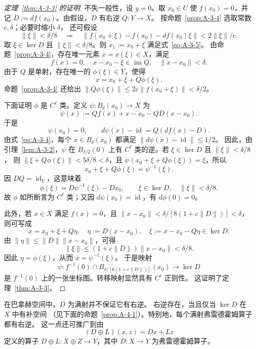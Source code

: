 \begin{proof}[定理~\ref{thm:A-3-3} 的证明]
不失一般性，设 $y=0$。取 $x_0\in U$ 使 $f(x_0)=0$，并记
$D:=df(x_0)$。由假设，$D$ 有右逆 $Q:Y\to X$。
按命题~\ref{prop:A-3-4} 选取常数 $c,\delta$；必要时缩小 $\delta$，
还可假设
\[
  \|\xi\|<\delta/8
  \quad\Longrightarrow\quad
  \|f(x_0+\xi)-f(x_0)-df(x_0)\xi\|<2\|\xi\|/c.
\]
取 $\xi\in\ker D$ 且 $\|\xi\|<\delta/8$。则
$x_1:=x_0+\xi$ 满足式~\eqref{eq:A-3-5}。
由命题~\ref{prop:A-3-4}，存在唯一元素 $x=x(\xi)\in X$，满足
\[
  f(x)=0,\quad x-x_0-\xi\in\operatorname{im}Q,
  \quad \|x-x_0\|<\delta.
\]
由于 $Q$ 是单射，存在唯一的 $\phi(\xi)\in Y$，使得
\[
  x=x_0+\xi+Q\phi(\xi).
\]
命题~\ref{prop:A-3-4} 还给出
$\|Q\phi(\xi)\|\le2c\|f(x_0+\xi)\|<\delta/2$。

下面证明 $\phi$ 是 $C^\ell$ 类。定义 $\psi:B_\delta(x_0)\to X$ 为
\[
  \psi(x):=Qf(x)+x-x_0-QD(x-x_0).
\]
于是
\[
  \psi(x_0)=0,
  \qquad d\psi(x)-\operatorname{id}=Q(df(x)-D).
\]
由式~\eqref{eq:A-3-4}，每个 $x\in B_\delta(x_0)$ 都满足
$\|d\psi(x)-\operatorname{id}\|\le1/2$。
因此，由引理~\ref{lem:A-3-2}，$\psi$ 在 $B_{\delta/2}(0)$
上有 $C^\ell$ 类的逆。若 $\xi\in\ker D$ 且 $\|\xi\|<\delta/8$，
则 $\|\xi+Q\phi(\xi)\|<5\delta/8<\delta$，且
$\psi(x_0+\xi+Q\phi(\xi))=\xi$，所以
\[
  x_0+\xi+Q\phi(\xi)=\psi^{-1}(\xi).
\]
因 $DQ=\operatorname{id}_Y$，这意味着
\[
  \phi(\xi)=D\psi^{-1}(\xi)-Dx_0,
  \qquad \xi\in\ker D,\quad\|\xi\|<\delta/8.
\]
故 $\phi$ 如所断言为 $C^\ell$ 类；又因
$d\psi(x_0)=\operatorname{id}$，有 $d\phi(0)=0$。

此外，若 $x\in X$ 满足 $f(x)=0$，且
$\|x-x_0\|<\delta/[8(1+c\|D\|)]<\delta$，
则可写成
\[
  x=x_0+\xi+Q\eta,\quad
  \eta:=D(x-x_0),\quad
  \xi:=x-x_0-Q\eta\in\ker D.
\]
由 $\|\eta\|\le\|D\|\|x-x_0\|$，可得
\[
  \|\xi\|\le(1+c\|D\|)\|x-x_0\|<\delta/8.
\]
因此 $\eta=\phi(\xi)$，从而 $x=\psi^{-1}(\xi)$。
于是映射
\[
  \psi:f^{-1}(0)\cap
  B_{\delta/[8(1+c\|D\|)]}(x_0)\longrightarrow\ker D
\]
是 $f^{-1}(0)$ 上的一张坐标图。转移映射显然具有 $C^\ell$ 正则性。
这证明了定理~\ref{thm:A-3-3}。
\end{proof}

在巴拿赫空间中，$D$ 为满射并不保证它有右逆。
右逆存在，当且仅当 $\ker D$ 在 $X$ 中有补空间
（见下面的命题~\ref{prop:A-4-1}）。特别地，每个满射弗雷德霍姆算子都有右逆。
这一点还可推广到由
\[
  (D\oplus L)(x,z)=Dx+Lz
\]
定义的算子 $D\oplus L:X\oplus Z\to Y$，其中 $D:X\to Y$ 为弗雷德霍姆算子。

